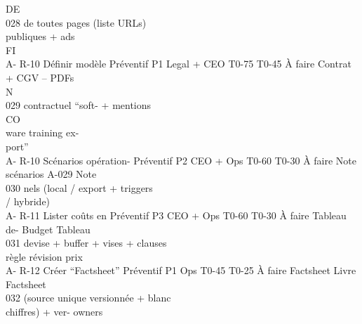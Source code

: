 \vspace{0.5em}
\vspace{0.5em}
\vspace{0.5em}
\vspace{0.5em}
DE\\
028         de toutes pages                                                       (liste URLs)\\
publiques + ads\\
\vspace{0.5em}
\vspace{0.5em}
\vspace{0.5em}
\vspace{0.5em}
FI\\
A- R-10     Définir modèle       Préventif P1   Legal + CEO T0-75 T0-45 À faire   Contrat + CGV –            PDFs\\
\vspace{0.5em}
\vspace{0.5em}
\vspace{0.5em}
\vspace{0.5em}
N\\
029         contractuel “soft-                                                    + mentions\\
\vspace{0.5em}
\vspace{0.5em}
CO\\
ware training ex-\\
port”\\
A- R-10     Scénarios opération- Préventif P2   CEO + Ops T0-60 T0-30 À faire     Note scénarios A-029       Note\\
030         nels (local / export                                                  + triggers\\
/ hybride)\\
A- R-11     Lister coûts en      Préventif P3   CEO + Ops T0-60 T0-30 À faire     Tableau de-     Budget     Tableau\\
031         devise + buffer +                                                     vises + clauses\\
règle révision prix\\
A- R-12     Créer “Factsheet” Préventif P1      Ops         T0-45 T0-25 À faire   Factsheet       Livre      Factsheet\\
032         (source unique                                                        versionnée +    blanc\\
chiffres) + ver-                                                      owners\\
